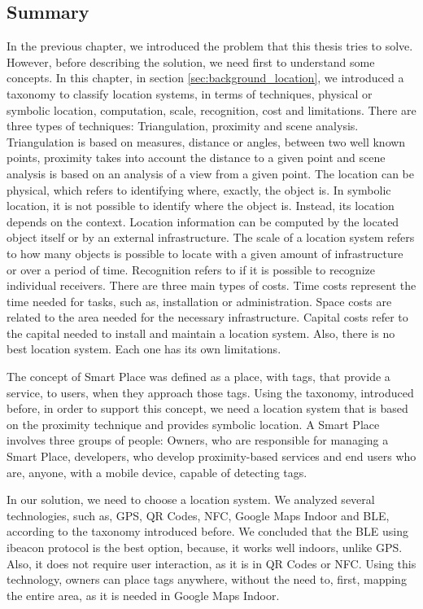 \subsection{Summary}
\label{sec:background_summary}
In the previous chapter, we introduced the problem that this thesis tries to solve.
However, before describing the solution, we need first to understand some concepts.
In this chapter, in section \ref{sec:background_location}, we introduced a taxonomy to classify location systems, in terms of techniques, physical or symbolic location, computation, scale, recognition, cost and limitations.
There are three types of techniques: Triangulation, proximity and scene analysis.
Triangulation is based on measures, distance or angles, between two well known points, proximity takes into account the distance to a given point and scene analysis is based on an analysis of a view from a given point.
The location can be physical, which refers to identifying where, exactly, the object is. In symbolic location, it is not possible to identify where the object is. Instead, its location depends on the context.
Location information can be computed by the located object itself or by an external infrastructure.
The scale of a location system refers to how many objects is possible to locate with a given amount of infrastructure or over a period of time.
Recognition refers to if it is possible to recognize individual receivers.
There are three main types of costs.
Time costs represent the time needed for tasks, such as, installation or administration.
Space costs are related to the area needed for the necessary infrastructure. Capital costs refer to the capital needed to install and maintain a location system.
Also, there is no best location system. Each one has its own limitations.

The concept of Smart Place was defined as a place, with tags, that provide a service, to users, when they approach those tags.
Using the taxonomy, introduced before, in order to support this concept, we need a location system that is based on the proximity technique and provides symbolic location.
A Smart Place involves three groups of people: Owners, who are responsible for managing a Smart Place, developers, who develop proximity-based services and end users who are, anyone, with a mobile device, capable of detecting tags.

In our solution, we need to choose a location system.
We analyzed several technologies, such as, \gls{GPS}, \gls{QR} Codes, \gls{NFC}, Google Maps Indoor and \gls{BLE}, according to the taxonomy introduced before.
We concluded that the \gls{BLE} using ibeacon protocol is the best option, because, it works well indoors, unlike \gls{GPS}.
Also, it does not require user interaction, as it is in \gls{QR} Codes or \gls{NFC}.
Using this technology, owners can place tags anywhere, without the need to, first, mapping the entire area, as it is needed in Google Maps Indoor.

